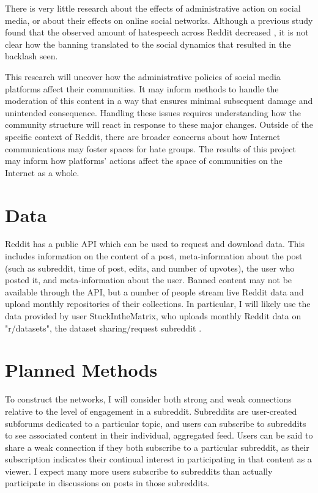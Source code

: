 \documentclass[twoside,twocolumn]{article}
\begin{document}
There is very little research about the effects of administrative action on social media, or about their effects on online social networks. Although a previous study found that the observed amount of hatespeech across Reddit decreased \cite{redditbanstudy}, it is not clear how the banning translated to the social dynamics that resulted in the backlash seen. 

This research will uncover how the administrative policies of social media platforms affect their communities. It may inform methods to handle the moderation of this content in a way that ensures minimal subsequent damage and unintended consequence. Handling these issues requires understanding how the community structure will react in response to these major changes. Outside of the specific context of Reddit, there are broader concerns about how Internet communications may foster spaces for hate groups. The results of this project may inform how platforms’ actions affect the space of communities on the Internet as a whole. 


\section{Data}

Reddit has a public API which can be used to request and download data. This includes information on the content of a post, meta-information about the post (such as subreddit, time of post, edits, and number of upvotes), the user who posted it, and meta-information about the user. Banned content may not be available through the API, but a number of people stream live Reddit data and upload monthly repositories of their collections. In particular, I will likely use the data provided by user Stuck\textunderscore In\textunderscore the\textunderscore Matrix, who uploads monthly Reddit data on "r/datasets", the dataset sharing/request subreddit \cite{stuckmatrixdata}. 


\section{Planned Methods}

To construct the networks, I will consider both strong and weak connections relative to the level of engagement in a subreddit. Subreddits are user-created subforums dedicated to a particular topic, and users can subscribe to subreddits to see associated content in their individual, aggregated feed. Users can be said to share a weak connection if they both subscribe to a particular subreddit, as their subscription indicates their continual interest in participating in that content as a viewer. I expect many more users subscribe to subreddits than actually participate in discussions on posts in those subreddits. 
\end{document}

